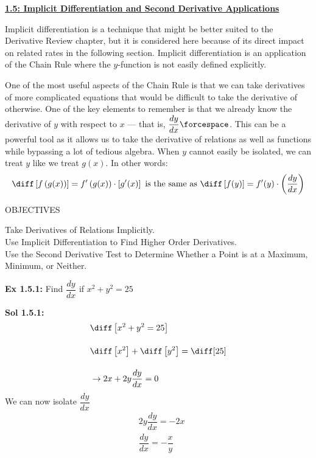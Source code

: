 \textbf{\underline{\large{1.5: Implicit Differentiation and Second Derivative Applications}}} \par

Implicit differentiation is a technique that might be better suited to the Derivative Review chapter, but it is considered here because of its direct impact on related rates in the following section. Implicit differentiation is an application of the Chain Rule where the $y$-function is not easily defined explicitly. \par 

One of the most useful aspects of the Chain Rule is that we can take derivatives of more complicated equations that would be difficult to take the derivative of otherwise. One of the key elements to remember is that we already know the derivative of $y$ with respect to $x$ --- that is, $\dfrac{dy}{dx} \forcespace$. This can be a powerful tool as it allows us to take the derivative of relations as well as functions while bypassing a lot of tedious algebra. When $y$ cannot easily be isolated, we can treat $y$ like we treat $g(x)$. In other words: \begin{align*}
    \diff \left[f\left(g(x)\right)\right] = f'\left(g(x)\right) \cdot \left[g'(x)\right] \text{ is the same as } \diff \left[f(y)\right] = f'(y) \cdot \left(\dfrac{dy}{dx}\right)
\end{align*}

\begin{tcolorbox}[objective]
    \begin{center}
        OBJECTIVES \\[11pt]
    \end{center}
    Take Derivatives of Relations Implicitly. \\
    Use Implicit Differentiation to Find Higher Order Derivatives. \\
    Use the Second Derivative Test to Determine Whether a Point is at a Maximum, Minimum, or Neither.
\end{tcolorbox} \vspace{11pt}

\begin{tcolorbox}[example]
    \textbf{Ex 1.5.1: } Find $\dfrac{dy}{dx}$ if $x^2 + y^2 = 25$
\end{tcolorbox}
\begin{tcolorbox}[solution]
    \textbf{Sol 1.5.1: } \begin{align*}
        & \diff \left[x^2 + y^2 = 25\right] \\[11pt]
        & \diff \left[x^2\right] + \diff \left[y^2\right] = \diff [25] \\[11pt]
        & \rightarrow 2x + 2y\dfrac{dy}{dx} = 0 
    \end{align*}
    We can now isolate $\dfrac{dy}{dx}$ \begin{align*}
        & 2y\dfrac{dy}{dx} = -2x \\[11pt]
        & \dfrac{dy}{dx} = \boxed{-\dfrac{x}{y}}
    \end{align*}
\end{tcolorbox}

